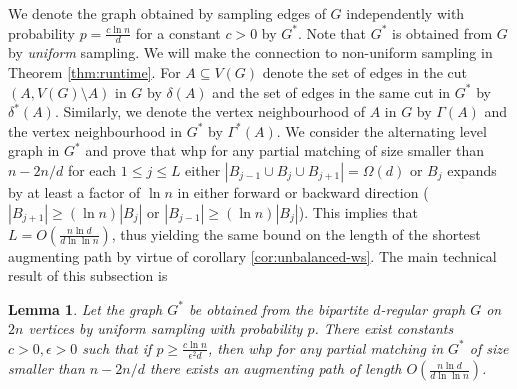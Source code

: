 \documentclass[11pt]{article}
\newcommand{\e}{{\epsilon}}
\newtheorem{lemma}[theorem]{Lemma}
\begin{document}
We denote the graph obtained by sampling edges of $G$ independently with probability $p=\frac{c\ln n}{d}$ for a constant $c>0$ by $G^*$. Note that $G^*$ is obtained from $G$ by \textit{uniform} sampling. We will make the connection to non-uniform sampling in Theorem \ref{thm:runtime}. For $A\subseteq V(G)$ denote the set of edges in the cut $(A, V(G)\setminus A)$ in $G$ by $\delta(A)$ and the set of edges in the same cut in $G^*$ by $\delta^*(A)$.
Similarly, we denote the vertex neighbourhood of $A$ in $G$ by $\Gamma(A)$ and the vertex neighbourhood in $G^*$ by $\Gamma^*(A)$.
 We consider the alternating level graph in $G^*$ and prove that whp for any partial matching of size smaller than $n-2n/d$ for
each $1\leq j\leq L$ either $|B_{j-1}\cup B_j\cup B_{j+1}|=\Omega(d)$ or $B_j$ expands by at least a factor of $\ln n$ in
either forward or backward direction ($|B_{j+1}|\geq (\ln n)|B_j|$ or $|B_{j-1}|\geq (\ln n) |B_j|$). This implies that $L=O\left(\frac{n\ln
    d}{d\ln \ln n}\right)$, thus yielding the same bound on the length of
the shortest augmenting path by virtue of corollary \ref{cor:unbalanced-ws}. The main technical result of this subsection is

\begin{lemma} \label{lm:main} Let the graph $G^*$ be obtained from the
  bipartite $d$-regular graph $G$ on $2n$ vertices by uniform sampling with
  probability $p$. There exist constants $c>0, \e>0$ such that if $p\geq
  \frac{c\ln n}{\e^2 d}$, then whp for any partial matching in $G^*$ of size
  smaller than $n-2n/d$ there exists an augmenting path of length
  $O\left(\frac{n\ln d}{d\ln \ln n}\right)$.
\end{lemma}
\end{document}
